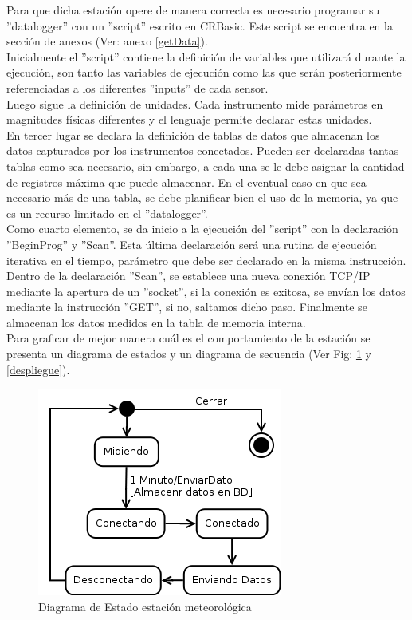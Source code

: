 Para que dicha estación opere de manera correcta es necesario programar su ''datalogger'' con un ''script'' escrito en CRBasic. Este script se encuentra en la sección de anexos (Ver: anexo \ref{getData}).\\

Inicialmente el ''script'' contiene la definición de variables que utilizará durante la ejecución, son tanto las variables de ejecución como las que serán posteriormente referenciadas a los diferentes ''inputs'' de cada sensor.\\
Luego sigue la definición de unidades. Cada instrumento mide parámetros en magnitudes físicas diferentes y el lenguaje permite declarar estas unidades.\\
En tercer lugar se declara la definición de tablas de datos que almacenan los datos capturados por los instrumentos conectados. Pueden ser declaradas tantas tablas como sea necesario, sin embargo, a cada una se le debe asignar la cantidad de registros máxima que puede almacenar. En el eventual caso en que sea necesario más de una tabla, se debe planificar bien el uso de la memoria, ya que es un recurso limitado en el ''datalogger''.\\
Como cuarto elemento, se da inicio a la ejecución del ''script'' con la declaración ''BeginProg'' y ''Scan''. Esta última declaración será una rutina de ejecución iterativa en el tiempo, parámetro que debe ser declarado en la misma instrucción.\\
Dentro de la declaración ''Scan'', se establece una nueva conexión TCP/IP mediante la apertura de un ''socket'', si la conexión es exitosa, se envían los datos mediante la instrucción ''GET'', si no, saltamos dicho paso. Finalmente se almacenan los datos medidos en la tabla de memoria interna.\\

Para graficar de mejor manera cuál es el comportamiento de la estación se presenta un diagrama de estados y un diagrama de secuencia (Ver Fig: \ref{estacionEstados} y \ref{despliegue}).

\begin{figure}[h!]
        \centering
        \includegraphics[scale=0.6]{images/estacionEstados}
        \caption{Diagrama de Estado estación meteorológica}
        \label{estacionEstados}
\end{figure}

